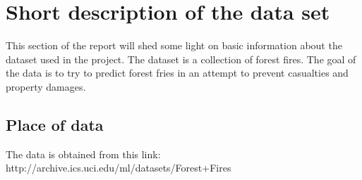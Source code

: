 \section{Short description of the data set}
This section of the report will shed some light on basic information about the dataset used in the project. The dataset is a collection of forest fires. The goal of the data is to try to predict forest fries in an attempt to prevent casualties and property damages.

\subsection{Place of data}
The data is obtained from this link: http://archive.ics.uci.edu/ml/datasets/Forest+Fires

